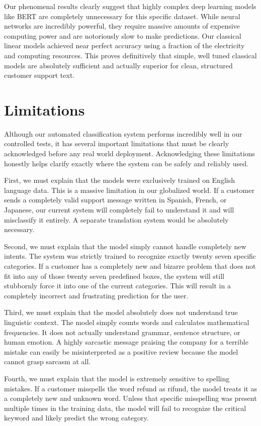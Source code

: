\documentclass[12pt]{article}
\begin{document}
Our phenomenal results clearly suggest that highly complex deep learning models like BERT are completely unnecessary for this specific dataset. While neural networks are incredibly powerful, they require massive amounts of expensive computing power and are notoriously slow to make predictions. Our classical linear models achieved near perfect accuracy using a fraction of the electricity and computing resources. This proves definitively that simple, well tuned classical models are absolutely sufficient and actually superior for clean, structured customer support text.

\section{Limitations}
Although our automated classification system performs incredibly well in our controlled tests, it has several important limitations that must be clearly acknowledged before any real world deployment. Acknowledging these limitations honestly helps clarify exactly where the system can be safely and reliably used. 

First, we must explain that the models were exclusively trained on English language data. This is a massive limitation in our globalized world. If a customer sends a completely valid support message written in Spanish, French, or Japanese, our current system will completely fail to understand it and will misclassify it entirely. A separate translation system would be absolutely necessary. 

Second, we must explain that the model simply cannot handle completely new intents. The system was strictly trained to recognize exactly twenty seven specific categories. If a customer has a completely new and bizarre problem that does not fit into any of those twenty seven predefined boxes, the system will still stubbornly force it into one of the current categories. This will result in a completely incorrect and frustrating prediction for the user. 

Third, we must explain that the model absolutely does not understand true linguistic context. The model simply counts words and calculates mathematical frequencies. It does not actually understand grammar, sentence structure, or human emotion. A highly sarcastic message praising the company for a terrible mistake can easily be misinterpreted as a positive review because the model cannot grasp sarcasm at all. 

Fourth, we must explain that the model is extremely sensitive to spelling mistakes. If a customer misspells the word refund as rifund, the model treats it as a completely new and unknown word. Unless that specific misspelling was present multiple times in the training data, the model will fail to recognize the critical keyword and likely predict the wrong category. 
\end{document}
